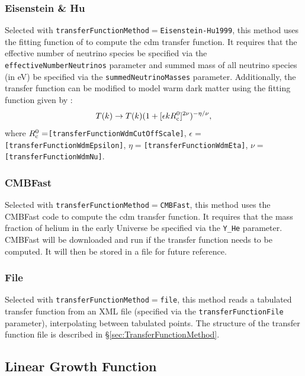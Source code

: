\subsubsection{Eisenstein \& Hu}

Selected with {\tt transferFunctionMethod}$=${\tt Eisenstein-Hu1999}, this method uses the fitting function of \cite{eisenstein_power_1999} to compute the \gls{cdm} transfer function. It requires that the effective number of neutrino species be specified via the {\tt effectiveNumberNeutrinos} parameter and summed mass of all neutrino species (in eV) be specified via the {\tt summedNeutrinoMasses} parameter. Additionally, the transfer function can be modified to model warm dark matter using the fitting function given by \cite{barkana_constraints_2001}:
\begin{equation}
T(k) \rightarrow T(k) (1+[\epsilon k R_{\rm c}^0]^{2\nu})^{-\eta/\nu},
\end{equation}
where $R_{\rm c}^0=${\tt [transferFunctionWdmCutOffScale]}, $\epsilon=${\tt [transferFunctionWdmEpsilon]}, $\eta=${\tt [transferFunctionWdmEta]}, $\nu=${\tt [transferFunctionWdmNu]}.

\subsubsection{{\sc CMBFast}}\label{sec:TransferFunction:CMBFast}

Selected with {\tt transferFunctionMethod}$=${\tt CMBFast}, this method uses the {\sc CMBFast} code to compute the \gls{cdm} transfer function. It requires that the mass fraction of helium in the early Universe be specified via the {\tt Y\_He} parameter. {\sc CMBFast} will be downloaded and run if the transfer function needs to be computed. It will then be stored in a file for future reference.

\subsubsection{File}

Selected with {\tt transferFunctionMethod}$=${\tt file}, this method reads a tabulated transfer function from an XML file (specified via the {\tt transferFunctionFile} parameter), interpolating between tabulated points. The structure of the transfer function file is described in \S\ref{sec:TransferFunctionMethod}.

\subsection{Linear Growth Function}

